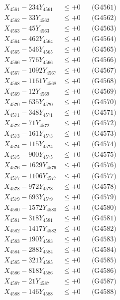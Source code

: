 \documentclass[a4paper,10pt]{article}
\begin{document}
{\begin{align}
\allowbreak
X_{4561} - 234Y_{4561} &\leq +0 && \text{(G4561)} \\
X_{4562} - 33Y_{4562} &\leq +0 && \text{(G4562)} \\
X_{4563} - 45Y_{4563} &\leq +0 && \text{(G4563)} \\
X_{4564} - 462Y_{4564} &\leq +0 && \text{(G4564)} \\
X_{4565} - 546Y_{4565} &\leq +0 && \text{(G4565)} \\
X_{4566} - 776Y_{4566} &\leq +0 && \text{(G4566)} \\
X_{4567} - 1092Y_{4567} &\leq +0 && \text{(G4567)} \\
X_{4568} - 1161Y_{4568} &\leq +0 && \text{(G4568)} \\
X_{4569} - 12Y_{4569} &\leq +0 && \text{(G4569)} \\
X_{4570} - 635Y_{4570} &\leq +0 && \text{(G4570)} \\
\allowbreak
X_{4571} - 348Y_{4571} &\leq +0 && \text{(G4571)} \\
X_{4572} - 71Y_{4572} &\leq +0 && \text{(G4572)} \\
X_{4573} - 161Y_{4573} &\leq +0 && \text{(G4573)} \\
X_{4574} - 115Y_{4574} &\leq +0 && \text{(G4574)} \\
X_{4575} - 900Y_{4575} &\leq +0 && \text{(G4575)} \\
X_{4576} - 1629Y_{4576} &\leq +0 && \text{(G4576)} \\
X_{4577} - 1106Y_{4577} &\leq +0 && \text{(G4577)} \\
X_{4578} - 972Y_{4578} &\leq +0 && \text{(G4578)} \\
X_{4579} - 693Y_{4579} &\leq +0 && \text{(G4579)} \\
X_{4580} - 1572Y_{4580} &\leq +0 && \text{(G4580)} \\
\allowbreak
X_{4581} - 318Y_{4581} &\leq +0 && \text{(G4581)} \\
X_{4582} - 1417Y_{4582} &\leq +0 && \text{(G4582)} \\
X_{4583} - 190Y_{4583} &\leq +0 && \text{(G4583)} \\
X_{4584} - 288Y_{4584} &\leq +0 && \text{(G4584)} \\
X_{4585} - 321Y_{4585} &\leq +0 && \text{(G4585)} \\
X_{4586} - 818Y_{4586} &\leq +0 && \text{(G4586)} \\
X_{4587} - 21Y_{4587} &\leq +0 && \text{(G4587)} \\
X_{4588} - 146Y_{4588} &\leq +0 && \text{(G4588)} \\

\end{align}}
\end{document}
